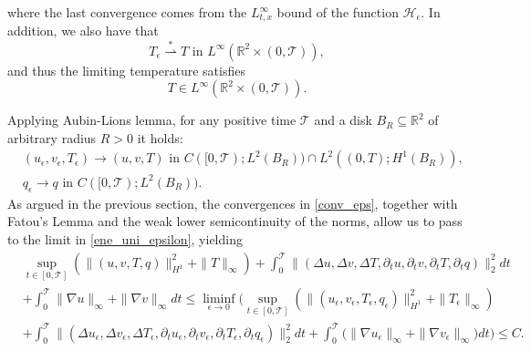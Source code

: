\documentclass[11pt, a4paper, article,reqno,]{amsart}
\theoremstyle{remark}
\numberwithin{equation}{section}
\begin{document}
where the last convergence comes from the $L^{\infty}_{t,x}$ bound of the function $\mathcal{H}_\epsilon$. In addition, we also have that 
\begin{equation*}
T_{\epsilon}\overset{\ast}{\rightharpoonup} T\mbox{ in }L^{\infty}(\mathbb{R}^2 \times (0,\mathcal{T})),
\end{equation*}
and thus the limiting temperature satisfies 
\begin{equation}\label{eq:finitet}
T\in L^{\infty}(\mathbb{R}^2 \times (0,\mathcal{T})). 
\end{equation}

Applying Aubin-Lions lemma, for any positive time $\mathcal{T}$ and a disk $B_R \subseteq \mathbb{R}^2$ of arbitrary radius $R>0$ it holds:
\begin{equation}\label{a_l_eps}
    \begin{aligned}
        & (u_{\epsilon},v_{\epsilon}, T_{\epsilon}) \rightarrow (u,v,T) \text{ in } C([0,\mathcal{T});L^2(B_R))\cap L^2((0,T);H^1(B_R)) , \\
        & q_{\epsilon} \rightarrow q \text{ in } C([0,\mathcal{T});L^2(B_R)).
    \end{aligned}
\end{equation}
As argued in the previous section, the convergences in \eqref{conv_eps}, together with Fatou's Lemma and the weak lower semicontinuity of the norms, allow us to pass to the limit in \eqref{ene_uni_epsilon}, yielding
\begin{equation*}
\begin{aligned}
& \sup_{t \in [0,\mathcal{T}]}\left( \|(u,v,T, q)\|_{H^1}^2 + \|T\|_\infty \right)
   + \int_0^\mathcal{T} \|(\Delta u, \Delta v, \Delta T, \partial_t u, \partial_t v, \partial_t T, \partial_t q)\|_2^2 dt \\
   & + \int_0^\mathcal{T} \|\nabla u\|_{\infty}+  \|\nabla v\|_{\infty} dt \leq  \liminf_{\epsilon \rightarrow 0} \Bigg(\sup_{t \in [0, \mathcal{T}]}\left(\|(u_\epsilon,v_\epsilon,T_{\epsilon}, q_\epsilon)\|_{H^1}^2 + \|T_\epsilon\|_\infty \right) 
   \\
   & + \int_0^\mathcal{T} \|(\Delta u_\epsilon, \Delta v_\epsilon, \Delta T_\epsilon, \partial_t u_\epsilon, \partial_t v_\epsilon, \partial_t T_{\epsilon}, \partial_t q_\epsilon)\|_2^2 dt + \int_0^\mathcal{T} \big( \|\nabla u_\epsilon\|_{\infty} + \|\nabla v_\epsilon\|_{\infty} \big) dt \Bigg) \leq C.
\end{aligned}
\end{equation*}
\end{document}
